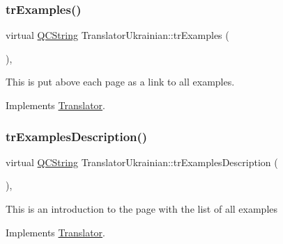 \mbox{\label{class_translator_ukrainian_a46110858d8731d02187ecceed9256e06}} 
\subsubsection{\texorpdfstring{trExamples()}{trExamples()}}
{\footnotesize\ttfamily virtual \mbox{\hyperlink{class_q_c_string}{Q\+C\+String}} Translator\+Ukrainian\+::tr\+Examples (\begin{DoxyParamCaption}{ }\end{DoxyParamCaption})\hspace{0.3cm}{\ttfamily [inline]}, {\ttfamily [virtual]}}

This is put above each page as a link to all examples. 

Implements \mbox{\hyperlink{class_translator}{Translator}}.

\mbox{\label{class_translator_ukrainian_a85e65ea6ee048466f16418f91f1abe8d}} 
\subsubsection{\texorpdfstring{trExamplesDescription()}{trExamplesDescription()}}
{\footnotesize\ttfamily virtual \mbox{\hyperlink{class_q_c_string}{Q\+C\+String}} Translator\+Ukrainian\+::tr\+Examples\+Description (\begin{DoxyParamCaption}{ }\end{DoxyParamCaption})\hspace{0.3cm}{\ttfamily [inline]}, {\ttfamily [virtual]}}

This is an introduction to the page with the list of all examples 

Implements \mbox{\hyperlink{class_translator}{Translator}}.

\mbox{\label{class_translator_ukrainian_a619b01ae603383d0d2143429aeebf0f3}} 
